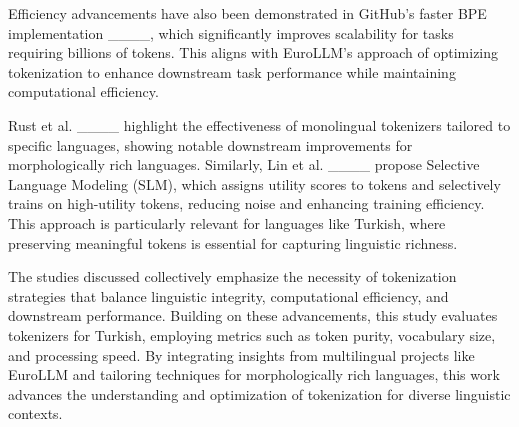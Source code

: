 Efficiency advancements have also been demonstrated in GitHub's faster BPE implementation ____, which significantly improves scalability for tasks requiring billions of tokens. This aligns with EuroLLM’s approach of optimizing tokenization to enhance downstream task performance while maintaining computational efficiency.

Rust et al. ____ highlight the effectiveness of monolingual tokenizers tailored to specific languages, showing notable downstream improvements for morphologically rich languages. Similarly, Lin et al. ____ propose Selective Language Modeling (SLM), which assigns utility scores to tokens and selectively trains on high-utility tokens, reducing noise and enhancing training efficiency. This approach is particularly relevant for languages like Turkish, where preserving meaningful tokens is essential for capturing linguistic richness.

The studies discussed collectively emphasize the necessity of tokenization strategies that balance linguistic integrity, computational efficiency, and downstream performance. Building on these advancements, this study evaluates tokenizers for Turkish, employing metrics such as token purity, vocabulary size, and processing speed. By integrating insights from multilingual projects like EuroLLM and tailoring techniques for morphologically rich languages, this work advances the understanding and optimization of tokenization for diverse linguistic contexts.